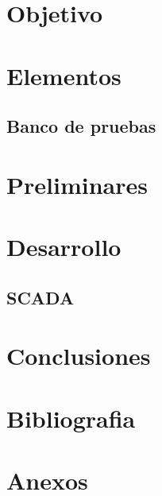 \documentclass[12pt,a4paper]{article}
\begin{document}
\section{Objetivo}






\section{Elementos}


\subsection{Banco de pruebas}

\section{Preliminares}

	
\section{Desarrollo}





\subsection{SCADA}


%

%



%



\section{Conclusiones}


		\newpage
\section{Bibliografia}


\printbibliography

\section{Anexos}

\end{document}
